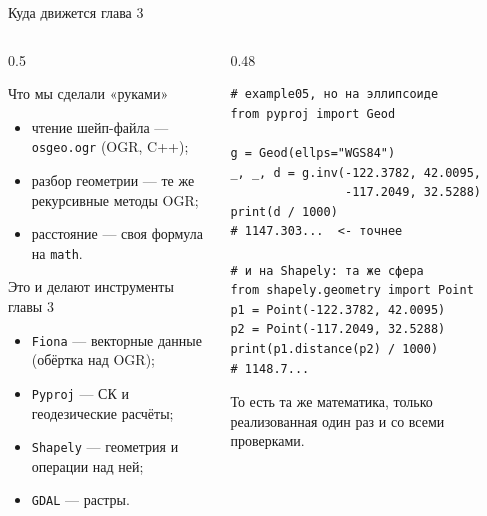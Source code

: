 \documentclass[aspectratio=169,10pt]{beamer}
\begin{document}
\begin{frame}[fragile]{Куда движется глава 3}
\footnotesize
\begin{columns}[T,onlytextwidth]
  \begin{column}{0.5\textwidth}
    \begin{block}{Что мы сделали «руками»}\small
      \begin{itemize}\itemsep1pt
        \item чтение шейп-файла --- \texttt{osgeo.ogr} (OGR, C++);
        \item разбор геометрии --- те же рекурсивные методы OGR;
        \item расстояние --- своя формула на \texttt{math}.
      \end{itemize}
    \end{block}
    \vspace{0.2em}
    \begin{alertblock}{Это и делают инструменты главы 3}\small
      \begin{itemize}\itemsep1pt
        \item \texttt{Fiona} --- векторные данные (обёртка над OGR);
        \item \texttt{Pyproj} --- СК и геодезические расчёты;
        \item \texttt{Shapely} --- геометрия и операции над ней;
        \item \texttt{GDAL} --- растры.
      \end{itemize}
    \end{alertblock}
  \end{column}
  \begin{column}{0.48\textwidth}
    \begin{Verbatim}[fontsize=\scriptsize]
# example05, но на эллипсоиде
from pyproj import Geod

g = Geod(ellps="WGS84")
_, _, d = g.inv(-122.3782, 42.0095,
                -117.2049, 32.5288)
print(d / 1000)
# 1147.303...  <- точнее

# и на Shapely: та же сфера
from shapely.geometry import Point
p1 = Point(-122.3782, 42.0095)
p2 = Point(-117.2049, 32.5288)
print(p1.distance(p2) / 1000)
# 1148.7...
\end{Verbatim}
    \vspace{0.3em}
    {\scriptsize То есть та же математика, только реализованная один раз
     и со всеми проверками.}
  \end{column}
\end{columns}
\end{frame}
\end{document}
